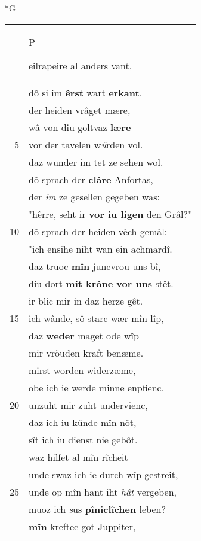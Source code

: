 \documentclass[8pt,a4paper,notitlepage]{article}
\begin{document}
\newpage
\begin{table}[ht]
\begin{minipage}[t]{0.5\linewidth}
\small
\begin{center}*G
\end{center}
\begin{tabular}{rl}
 & \begin{large}P\end{large}eilrapeire al anders vant,\\ 
 & dô si im \textbf{êrst} wart \textbf{erkant}.\\ 
 & der heiden vrâget mære,\\ 
 & wâ von diu goltvaz \textbf{lære}\\ 
5 & vor der tavelen w\textit{ü}rden vol.\\ 
 & daz wunder im tet ze sehen wol.\\ 
 & dô sprach der \textbf{clâre} Anfortas,\\ 
 & der \textit{im} ze gesellen gegeben was:\\ 
 & "hêrre, seht ir \textbf{vor iu ligen} den Grâl?"\\ 
10 & dô sprach der heiden vêch gemâl:\\ 
 & "ich ensihe niht wan ein achmardî.\\ 
 & daz truoc \textbf{mîn} juncvrou uns bî,\\ 
 & diu dort \textbf{mit krône vor uns} stêt.\\ 
 & ir blic mir in daz herze gêt.\\ 
15 & ich wânde, sô starc wær mîn lîp,\\ 
 & daz \textbf{weder} maget ode wîp\\ 
 & mir vröuden kraft benæme.\\ 
 & mirst worden widerzæme,\\ 
 & obe ich ie werde minne enpfienc.\\ 
20 & unzuht mir zuht undervienc,\\ 
 & daz ich iu künde mîn nôt,\\ 
 & sît ich iu dienst nie gebôt.\\ 
 & waz hilfet al mîn rîcheit\\ 
 & unde swaz ich ie durch wîp gestreit,\\ 
25 & unde op mîn hant iht \textit{hât} vergeben,\\ 
 & muoz ich \textit{s}us \textbf{pîniclîchen} leben?\\ 
 & \textbf{mîn} kreftec got Juppiter,\\ 

\end{tabular}
\end{minipage}
\end{table}
\end{document}
